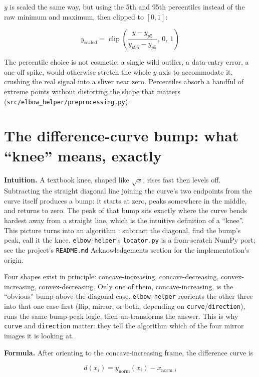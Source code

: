 \documentclass[11pt]{article}
\newcommand{\code}[1]{\texttt{#1}}
\begin{document}
$y$ is scaled the same way, but using the 5th and 95th percentiles instead
of the raw minimum and maximum, then clipped to $[0,1]$:

\begin{equation}
y_{\text{scaled}} = \operatorname{clip}\!\left(\frac{y - y_{p5}}{y_{p95} - y_{p5}},\ 0,\ 1\right)
\end{equation}

The percentile choice is not cosmetic: a single wild outlier, a data-entry
error, a one-off spike, would otherwise stretch the whole $y$ axis to
accommodate it, crushing the real signal into a sliver near zero.
Percentiles absorb a handful of extreme points without distorting the shape
that matters (\code{src/elbow\_helper/preprocessing.py}).

\section{The difference-curve bump: what ``knee'' means, exactly}
\label{sec:diff-curve}

\textbf{Intuition.} A textbook knee, shaped like $\sqrt{x}$, rises fast then
levels off. Subtracting the straight diagonal line joining the curve's two
endpoints from the curve itself produces a bump: it starts at zero, peaks
somewhere in the middle, and returns to zero. The peak of that bump sits
exactly where the curve bends hardest away from a straight line, which is
the intuitive definition of a ``knee''. This picture turns into an algorithm
\citep{satopaa2011}: subtract the diagonal, find the bump's peak, call it the
knee. \code{elbow-helper}'s \code{locator.py} is a from-scratch NumPy port;
see the project's \code{README.md} Acknowledgements section for the
implementation's origin.

Four shapes exist in principle: concave-increasing, concave-decreasing,
convex-increasing, convex-decreasing. Only one of them,
concave-increasing, is the ``obvious'' bump-above-the-diagonal case.
\code{elbow-helper} reorients the other three into that one case first
(flip, mirror, or both, depending on \code{curve}/\code{direction}), runs
the same bump-peak logic, then un-transforms the answer. This is why
\code{curve} and \code{direction} matter: they tell the algorithm which of
the four mirror images it is looking at.

\textbf{Formula.} After orienting to the concave-increasing frame, the
difference curve is

\begin{equation}
d(x_i) = y_{\text{norm}}(x_i) - x_{\text{norm}, i}
\end{equation}
\end{document}
